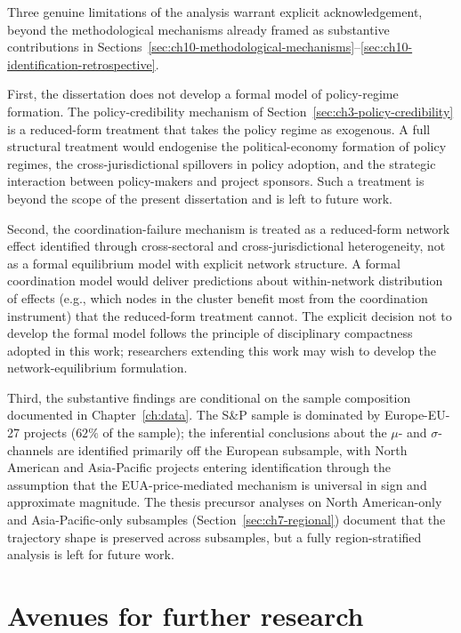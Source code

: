 Three genuine limitations of the analysis warrant explicit acknowledgement, beyond the methodological mechanisms already framed as substantive contributions in Sections~\ref{sec:ch10-methodological-mechanisms}--\ref{sec:ch10-identification-retrospective}.

First, the dissertation does not develop a formal model of policy-regime formation. The policy-credibility mechanism of Section~\ref{sec:ch3-policy-credibility} is a reduced-form treatment that takes the policy regime as exogenous. A full structural treatment would endogenise the political-economy formation of policy regimes, the cross-jurisdictional spillovers in policy adoption, and the strategic interaction between policy-makers and project sponsors. Such a treatment is beyond the scope of the present dissertation and is left to future work.

Second, the coordination-failure mechanism is treated as a reduced-form network effect identified through cross-sectoral and cross-jurisdictional heterogeneity, not as a formal equilibrium model with explicit network structure. A formal coordination model would deliver predictions about within-network distribution of effects (e.g., which nodes in the cluster benefit most from the coordination instrument) that the reduced-form treatment cannot. The explicit decision not to develop the formal model follows the principle of disciplinary compactness adopted in this work; researchers extending this work may wish to develop the network-equilibrium formulation.

Third, the substantive findings are conditional on the sample composition documented in Chapter~\ref{ch:data}. The S\&P sample is dominated by Europe-EU-27 projects ($62\%$ of the sample); the inferential conclusions about the $\mu$- and $\sigma$-channels are identified primarily off the European subsample, with North American and Asia-Pacific projects entering identification through the assumption that the EUA-price-mediated mechanism is universal in sign and approximate magnitude. The thesis precursor analyses on North American-only and Asia-Pacific-only subsamples (Section~\ref{sec:ch7-regional}) document that the trajectory shape is preserved across subsamples, but a fully region-stratified analysis is left for future work.

\section{Avenues for further research}
\label{sec:ch10-future}

